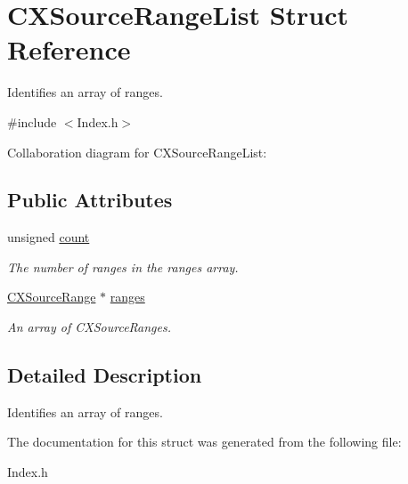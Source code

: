 \hypertarget{structCXSourceRangeList}{}\section{C\+X\+Source\+Range\+List Struct Reference}
\label{structCXSourceRangeList}


Identifies an array of ranges.  




{\ttfamily \#include $<$Index.\+h$>$}



Collaboration diagram for C\+X\+Source\+Range\+List\+:
\subsection*{Public Attributes}
\begin{DoxyCompactItemize}
\item 
\mbox{\label{structCXSourceRangeList_a8d96078ca094e4e98707001487feb78a}} 
unsigned \hyperlink{structCXSourceRangeList_a8d96078ca094e4e98707001487feb78a}{count}
\begin{DoxyCompactList}\small\item\em The number of ranges in the {\ttfamily ranges} array. \end{DoxyCompactList}\item 
\mbox{\label{structCXSourceRangeList_a5249f89df8acfcbbae6db8c6209743d5}} 
\hyperlink{structCXSourceRange}{C\+X\+Source\+Range} $\ast$ \hyperlink{structCXSourceRangeList_a5249f89df8acfcbbae6db8c6209743d5}{ranges}
\begin{DoxyCompactList}\small\item\em An array of {\ttfamily C\+X\+Source\+Ranges}. \end{DoxyCompactList}\end{DoxyCompactItemize}


\subsection{Detailed Description}
Identifies an array of ranges. 

The documentation for this struct was generated from the following file\+:\begin{DoxyCompactItemize}
\item 
Index.\+h\end{DoxyCompactItemize}
